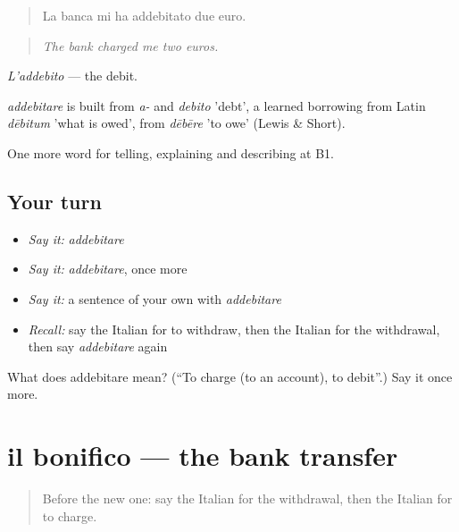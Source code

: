 \begin{quote}
La banca mi ha addebitato due euro.
\end{quote}

\begin{quote}
\emph{The bank charged me two euros.}
\end{quote}

\emph{L'addebito} — the debit.

\begin{cousinweb}
\emph{addebitare} is built from \emph{a-} and \emph{debito} 'debt', a learned borrowing from Latin \emph{dēbitum} 'what is owed', from \emph{dēbēre} 'to owe' (Lewis \& Short).
\end{cousinweb}

\begin{grammarlens}[title={What you've built}]
One more word for telling, explaining and describing at B1.
\end{grammarlens}

\subsection*{Your turn}
\begin{itemize}
\raggedright
  \item \emph{Say it:} \emph{addebitare}
  \item \emph{Say it:} \emph{addebitare}, once more
  \item \emph{Say it:} a sentence of your own with \emph{addebitare}
  \item \emph{Recall:} say the Italian for to withdraw, then the Italian for the withdrawal, then say \emph{addebitare} again
\end{itemize}

\begin{tcolorbox}[breakable,colback=teal!4,colframe=teal!35!black,title={Before you move on}]
What does addebitare mean? (\textquotedblleft{}To charge (to an account), to debit\textquotedblright{}.) Say it once more.
\end{tcolorbox}
\section[il bonifico]{il bonifico — the bank transfer}

\label{lesson:IT-C459-bonifico}



\begin{quote}
Before the new one: say the Italian for the withdrawal, then the Italian for to charge.
\end{quote}


